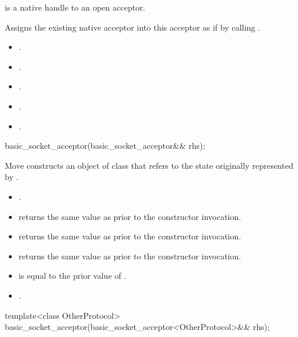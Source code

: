 \begin{itemdescr}
\pnum
\requires {} is a native handle to an open acceptor.

\pnum
\effects Assigns the existing native acceptor into this acceptor as if by calling .

\pnum
\postconditions 
\begin{itemize}
\item
{}.
\item
{}.
\item
{}.
\item
{}.
\item
{}.
\end{itemize}
\end{itemdescr}

\begin{itemdecl}
basic_socket_acceptor(basic_socket_acceptor&& rhs);
\end{itemdecl}

\begin{itemdescr}
\pnum
\effects Move constructs an object of class  that refers to the state originally represented by .

\pnum
\postconditions 
\begin{itemize}
\item
{}.
\item
{} returns the same value as  prior to the constructor invocation.
\item
{} returns the same value as  prior to the constructor invocation.
\item
{} returns the same value as  prior to the constructor invocation.
\item
{} is equal to the prior value of .
\item
{}.
\end{itemize}
\end{itemdescr}

\begin{itemdecl}
template<class OtherProtocol>
  basic_socket_acceptor(basic_socket_acceptor<OtherProtocol>&& rhs);
\end{itemdecl}

